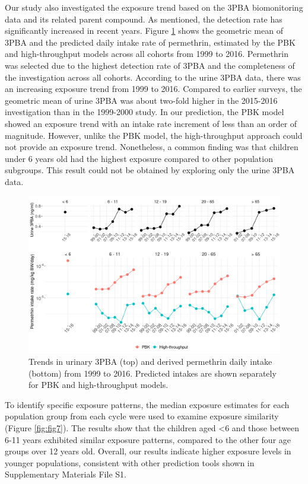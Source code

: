 \documentclass[toxics,article,submit,pdftex,moreauthors]{Definitions/mdpi}
\begin{document}
Our study also investigated the exposure trend based on the 3PBA
biomonitoring data and its related parent compound. As mentioned, the
detection rate has significantly increased in recent years. Figure
\ref{fig:fig6} shows the geometric mean of 3PBA and the predicted daily
intake rate of permethrin, estimated by the PBK and high-throughput
models across all cohorts from 1999 to 2016. Permethrin was selected due
to the highest detection rate of 3PBA and the completeness of the
investigation across all cohorts. According to the urine 3PBA data,
there was an increasing exposure trend from 1999 to 2016. Compared to
earlier surveys, the geometric mean of urine 3PBA was about two-fold
higher in the 2015-2016 investigation than in the 1999-2000 study. In our
prediction, the PBK model showed an exposure trend with an intake rate
increment of less than an order of magnitude. However, unlike the PBK
model, the high-throughput approach could not provide an exposure trend.
Nonetheless, a common finding was that children under 6 years old had
the highest exposure compared to other population subgroups. This result
could not be obtained by exploring only the urine 3PBA data.

\begin{figure}[H]
\centering
\begin{adjustwidth}{-2cm}{}
\centering
\includegraphics[width=\linewidth]{figures/fig6}
\hfill
\end{adjustwidth}
\caption{Trends in urinary 3PBA (top) and derived permethrin daily intake (bottom) from 1999
to 2016. Predicted intakes are shown separately for PBK and high-throughput models.\label{fig:fig6}}
\end{figure}

To identify specific exposure patterns, the median exposure estimates
for each population group from each cycle were used to examine exposure
similarity (Figure \ref{fig:fig7}). The results show that the children
aged \textless6 and those between 6-11 years exhibited similar exposure
patterns, compared to the other four age groups over 12 years old. Overall,
our results indicate higher exposure levels in younger populations,
consistent with other prediction tools shown in Supplementary Materials
File S1.
\end{document}
